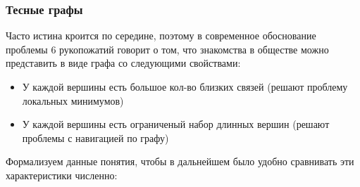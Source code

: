 



\subsubsection{Тесные графы}

Часто истина кроится по середине, поэтому в современное обоснование
проблемы 6 рукопожатий говорит о том, что знакомства в обществе можно
представить в виде графа со следующими свойствами:

\begin{itemize}
    \item У каждой вершины есть большое кол-во близких связей 
(решают проблему локаль\-ных минимумов)
    \item У каждой вершины есть ограниченый набор длинных вершин
(решают проблемы с навигацией по графу) 
\end{itemize}

Формализуем данные понятия, чтобы в дальнейшем было удобно 
сравнивать эти ха\-рактеристики численно:















